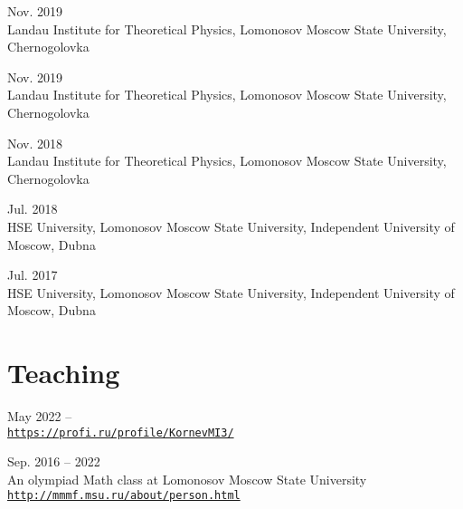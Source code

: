 \documentclass[11pt,letterpaper]{report}
\begin{document}
\begin{tablist}
       \item{Nov. 2019} \\ Landau Institute for Theoretical Physics, Lomonosov Moscow State University, Chernogolovka
       
       \item{Nov. 2019} \\ Landau Institute for Theoretical Physics, Lomonosov Moscow State University, Chernogolovka
       
        \item{Nov. 2018} \\ Landau Institute for Theoretical Physics, Lomonosov Moscow State University, Chernogolovka
       
       \item{Jul. 2018} \\ HSE University, Lomonosov Moscow State University, Independent University of Moscow, Dubna
       
        \item{Jul. 2017} \\ HSE University, Lomonosov Moscow State University, Independent University of Moscow, Dubna
        
            
    \end{tablist}

    
    
    
    
    \section*{Teaching}

    \begin{tablist}
    
       \item{May 2022 --} \\ \href{https://profi.ru/profile/KornevMI3/}{\tt https://profi.ru/profile/KornevMI3/} 

        \item{Sep. 2016 -- 2022} \\ An olympiad Math class at Lomonosov Moscow State University\\ \href{http://mmmf.msu.ru/about/person.html}{\tt http://mmmf.msu.ru/about/person.html}
        
    \end{tablist}
    
\end{document}
